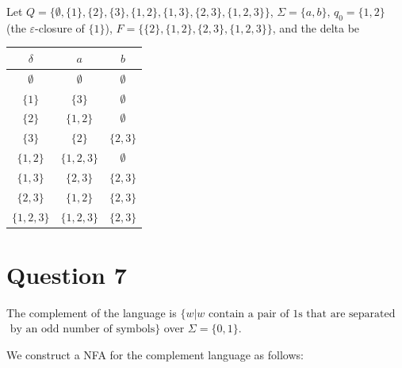 \documentclass[a4paper, UTF-8]{article}
\theoremstyle{plain}
\begin{document}
Let $Q = \{\emptyset, \{1\}, \{2\}, \{3\}, \{1, 2\}, \{1, 3\}, \{2, 3\}, \{1, 2, 3\}\}$, $\Sigma = \{a, b\}$, $q_0 = \{1, 2\}$ (the $\varepsilon$-closure of $\{1\}$), $F = \{\{2\}, \{1, 2\}, \{2, 3\}, \{1, 2, 3\}\}$, and the delta be

\begin{center}
\begin{tabular}{c|c|c}
    $\delta$ & $a$ & $b$ \\
    \hline
    $\emptyset$ & $\emptyset$ & $\emptyset$ \\
    $\{1\}$ & $\{3\}$ & $\emptyset$ \\
    $\{2\}$ & $\{1, 2\}$ & $\emptyset$ \\
    $\{3\}$ & $\{2\}$ & $\{2, 3\}$ \\
    $\{1, 2\}$ & $\{1, 2, 3\}$ & $\emptyset$ \\
    $\{1, 3\}$ & $\{2, 3\}$ & $\{2, 3\}$ \\
    $\{2, 3\}$ & $\{1, 2\}$ & $\{2, 3\}$ \\
    $\{1, 2, 3\}$ & $\{1, 2, 3\}$ & $\{2, 3\}$ \\
\end{tabular}
\end{center}


\section{Question 7}

The complement of the language is $\{w| w \text{ contain a pair of 1s that are separated}$
$\text{ by an odd number of symbols}\}$ over $\Sigma = \{0, 1\}$. 

We construct a NFA for the complement language as follows:
\begin{center}
\end{center}
\end{document}
